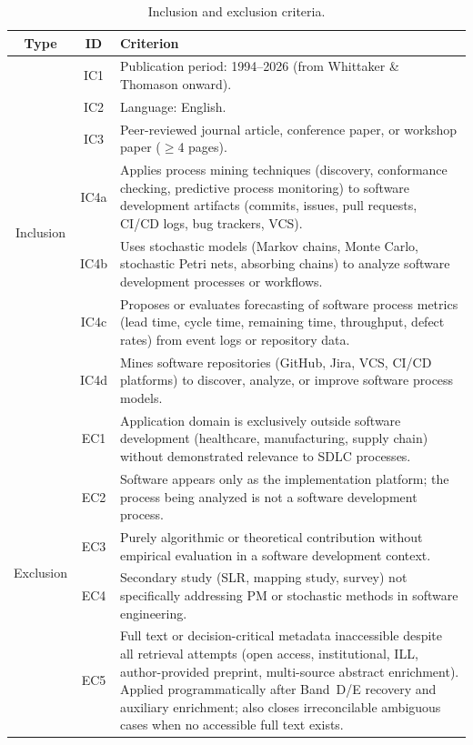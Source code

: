 \begin{table}[htbp]
\centering
\caption{Inclusion and exclusion criteria.}
\label{tab:criteria}
\small
\setlength{\tabcolsep}{4pt}
\begin{tabular}{c c p{10.2cm}}
\toprule
\textbf{Type} & \textbf{ID} & \textbf{Criterion} \\
\midrule
\multirow{7}{*}{Inclusion}
& IC1  & Publication period: 1994--2026 (from Whittaker \& Thomason onward). \\
& IC2  & Language: English. \\
& IC3  & Peer-reviewed journal article, conference paper, or workshop paper
          ($\geq$4 pages). \\
& IC4a & Applies process mining techniques (discovery, conformance checking,
          predictive process monitoring) to software development artifacts
          (commits, issues, pull requests, CI/CD logs, bug trackers, VCS). \\
& IC4b & Uses stochastic models (Markov chains, Monte Carlo, stochastic Petri
          nets, absorbing chains) to analyze software development processes or
          workflows. \\
& IC4c & Proposes or evaluates forecasting of software process metrics (lead
          time, cycle time, remaining time, throughput, defect rates) from
          event logs or repository data. \\
& IC4d & Mines software repositories (GitHub, Jira, VCS, CI/CD platforms) to
          discover, analyze, or improve software process models. \\
\midrule
\multirow{5}{*}{Exclusion}
& EC1  & Application domain is exclusively outside software development
          (healthcare, manufacturing, supply chain) without demonstrated
          relevance to SDLC processes. \\
& EC2  & Software appears only as the implementation platform; the process
          being analyzed is not a software development process. \\
& EC3  & Purely algorithmic or theoretical contribution without empirical
          evaluation in a software development context. \\
& EC4  & Secondary study (SLR, mapping study, survey) not specifically
          addressing PM or stochastic methods in software engineering. \\
& EC5  & Full text or decision-critical metadata inaccessible despite all
          retrieval attempts (open access, institutional, ILL,
          author-provided preprint, multi-source abstract enrichment).
          Applied programmatically after Band~D/E recovery and auxiliary
          enrichment; also closes irreconcilable ambiguous cases when no
          accessible full text exists. \\
\bottomrule
\end{tabular}
\end{table}

